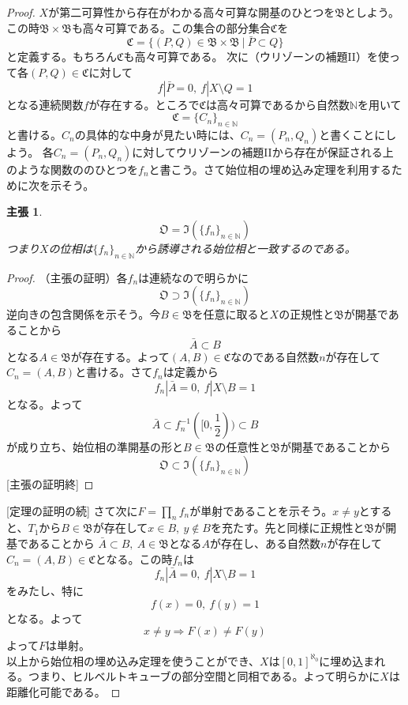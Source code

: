 \documentclass{jsarticle}
\newtheorem*{claim}{主張}
\begin{document}
\begin{proof}
$X$が第二可算性から存在がわかる高々可算な開基のひとつを$\mathfrak{B}$としよう。
この時$\mathfrak{B}\times \mathfrak{B}$も高々可算である。この集合の部分集合$\mathfrak{C}$を
\[
\mathfrak{C}=\{(P,Q)\in \mathfrak{B}\times\mathfrak{B}\ |\ \bar{P}\subset Q\}
\]と定義する。もちろん$\mathfrak{C}$も高々可算である。
次に（ウリゾーンの補題II）を使って各$(P,Q)\in \mathfrak{C}$に対して
\[
f|\bar{P}=0,\ f|X\setminus Q=1
\]
となる連続関数$f$が存在する。ところで$\mathfrak{C}$は高々可算であるから自然数$\mathbb{N}$を用いて
\[
\mathfrak{C}=\{C_n\}_{n\in\mathbb{N}}
\]と書ける。$C_n$の具体的な中身が見たい時には、$C_n=(P_n,Q_n)$と書くことにしよう。
各$C_n=(P_n,Q_n)$に対してウリゾーンの補題IIから存在が保証される上のような関数ののひとつを$f_n$と書こう。さて始位相の埋め込み定理を利用するために次を示そう。
\begin{claim}
\[
\mathfrak{O}=\mathfrak{I}(\{f_n\}_{n\in \mathbb{N}})
\]
つまり$X$の位相は$\{f_n\}_{n\in \mathbb{N}}$から誘導される始位相と一致するのである。
\end{claim}
\begin{proof}（主張の証明）各$f_n$は連続なので明らかに
\[
\mathfrak{O}\supset \mathfrak{I}(\{f_n\}_{n\in \mathbb{N}})
\]逆向きの包含関係を示そう。今$B\in \mathfrak{B}$を任意に取ると$X$の正規性と$\mathfrak{B}$が開基であることから
\[
\bar{A}\subset B
\]
となる$A\in \mathfrak{B}$が存在する。よって$(A,B)\in \mathfrak{C}$なのである自然数$n$が存在して$C_n=(A,B)$と書ける。さて$f_n$は定義から
\[
f_n|\bar{A}=0,\ f|X\setminus B=1
\]となる。よって
\[
\bar{A}\subset f_n^{-1}([0,\frac{1}{2}))\subset B
\]
が成り立ち、始位相の準開基の形と$B\in\mathfrak{B}$の任意性と$\mathfrak{B}$が開基であることから
\[
\mathfrak{O}\subset \mathfrak{I}(\{f_n\}_{n\in \mathbb{N}})
\]
[主張の証明終]\end{proof} 
[定理の証明の続]
さて次に$F=\prod_{n}f_n$が単射であることを示そう。$x\neq y$とすると、$T_1$から$B\in \mathfrak{B}$が存在して$x\in B, \ y\not\in B$を充たす。先と同様に正規性と$\mathfrak{B}$が開基であることから
$\bar{A}\subset B,\ A\in \mathfrak{B}$となる$A$が存在し、ある自然数$n$が存在して
$C_n=(A,B)\in \mathfrak{C}$となる。この時$f_n$は
\[
f_n|\bar{A}=0,\ f|X\setminus B=1
\]をみたし、特に
\[
f(x)=0,\ f(y)=1
\]
となる。よって
\[
x\neq y\Rightarrow F(x)\neq F(y)
\]よって$F$は単射。\\ 
以上から始位相の埋め込み定理を使うことができ、$X$は$[0,1]^{\aleph_0}$に埋め込まれる。つまり、ヒルベルトキューブの部分空間と同相である。よって明らかに$X$は距離化可能である。
\end{proof}
\end{document}
